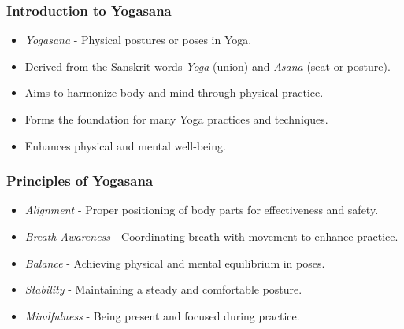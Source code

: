 \begin{frame}[fragile]\frametitle{Introduction to Yogasana}

      \begin{itemize}
		\item \textit{Yogasana} - Physical postures or poses in Yoga.
		\item Derived from the Sanskrit words \textit{Yoga} (union) and \textit{Asana} (seat or posture).
		\item Aims to harmonize body and mind through physical practice.
		\item Forms the foundation for many Yoga practices and techniques.
		\item Enhances physical and mental well-being.
	  \end{itemize}

\end{frame}

\begin{frame}[fragile]\frametitle{Principles of Yogasana}

      \begin{itemize}
		\item \textit{Alignment} - Proper positioning of body parts for effectiveness and safety.
		\item \textit{Breath Awareness} - Coordinating breath with movement to enhance practice.
		\item \textit{Balance} - Achieving physical and mental equilibrium in poses.
		\item \textit{Stability} - Maintaining a steady and comfortable posture.
		\item \textit{Mindfulness} - Being present and focused during practice.
	  \end{itemize}

\end{frame}

